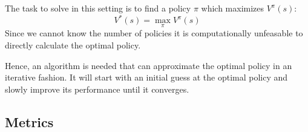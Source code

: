 \documentclass[a4paper,10pt]{article}
\begin{document}
The task to solve in this setting is to find a policy $\pi$ which maximizes $V^\pi(s)$:
\[V^*(s) = \max_\pi V^\pi(s)\]
Since we cannot know the number of policies it is computationally unfeasable to directly calculate the optimal policy.

Hence, an algorithm is needed that can approximate the optimal policy in an iterative fashion.
It will start with an initial guess at the optimal policy and slowly improve its performance until it converges.





\subsection{Metrics}
\end{document}
